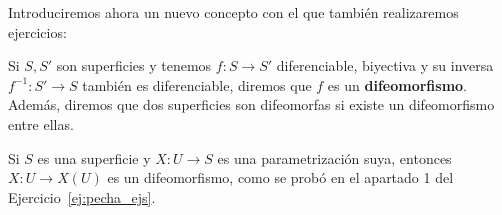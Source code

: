 \newpage
\noindent
Introduciremos ahora un nuevo concepto con el que también realizaremos ejercicios:
\begin{definicion}
    Si $S,S'$ son superficies y tenemos $f:S\to S'$ diferenciable, biyectiva y su inversa $f^{-1}:S'\to S$ también es diferenciable, diremos que $f$ es un \textbf{difeomorfismo}.\\

    \noindent
    Además, diremos que dos superficies son difeomorfas si existe un difeomorfismo entre ellas.
\end{definicion}

\begin{ejemplo}
    Si $S$ es una superficie y $X:U\to S$ es una parametrización suya, entonces $X:U\to X(U)$  es un difeomorfismo, como se probó en el apartado 1 del Ejercicio~\ref{ej:pecha_ejs}.
\end{ejemplo}

